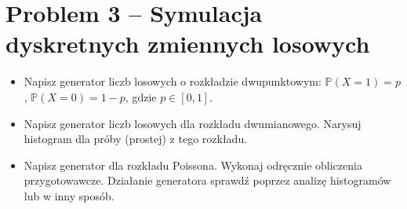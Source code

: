 \documentclass[12pt, a4paper]{article}\usepackage[]{graphicx}\usepackage[]{xcolor}
\begin{document}
\newpage
\section{Problem 3 -- Symulacja dyskretnych zmiennych losowych}

\begin{itemize}
\item Napisz generator liczb losowych o rozkładzie dwupunktowym: $\mathbb P(X=1)=p$, $\mathbb P(X=0)=1-p$, gdzie $p\in [0,1]$.

\item Napisz generator liczb losowych dla rozkładu dwumianowego. Narysuj histogram dla próby (prostej) z tego rozkładu.

\item Napisz generator dla rozkładu Poissona. Wykonaj odręcznie obliczenia przygotowawcze. 
Działanie generatora sprawdź poprzez analizę histogramów lub w inny sposób.
\end{itemize}

\medskip

\vspace{15pt}
\end{document}
